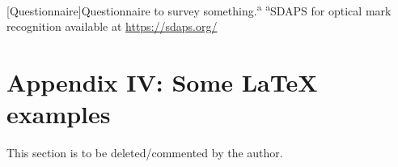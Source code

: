 \begin{center}
\begin{minipage}{\columnwidth}%
	\centering
	[Questionnaire]{Questionnaire to survey something.\textsuperscript{a}}
	\small\textsuperscript{a}{SDAPS for optical mark recognition available at \url{https://sdaps.org/}}
\end{minipage}
\end{center}
	

\clearpage  %
\section*{Appendix IV: Some \LaTeX{} examples}

This section is to be deleted/commented by the author.
